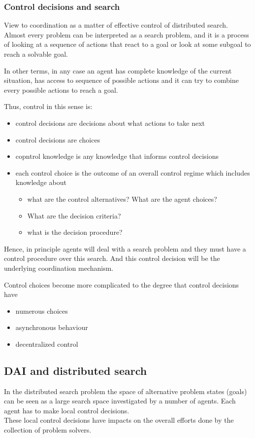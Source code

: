 \subsubsection{Control decisions and search}
View to coordination as a matter of effective control of distributed search.\\
Almost every problem can be interpreted as a search problem, and it is a process of looking at a sequence of actions that react to a goal or look at some subgoal to reach a  solvable goal.

In other terms, in any case an agent has complete knowledge of the current  situation, has access to sequence of possible actions and it can try to combine every possible actions to reach a goal.

Thus, control in this sense is:
\begin{itemize}
\item control decisions are decisions about what actions to take next
\item control decisions are choices
\item copntrol knowledge is any knowledge that informs control decisions
\item each control choice is the outcome of an overall control regime which includes knowledge about
\begin{itemize}
\item what are the control alternatives? What are the agent choices?
\item What are the decision criteria? 
\item what is the decision procedure?
\end{itemize}
\end{itemize}

Hence, in principle agents will deal with a search problem and they must have a control procedure over this search. And this control decision will be the underlying coordination mechanism.

Control choices become more complicated to the degree that control decisions have
\begin{itemize}
\item numerous choices
\item asynchronous behaviour
\item decentralized control
\end{itemize}

\subsection{DAI and distributed search}
In the distributed search problem the space of alternative problem states (goals) can be seen as a large search space investigated by a number of agents. Each agent has to make local control decisions.\\
These local control decisions have impacts on the overall efforts done by the collection of problem solvers.

